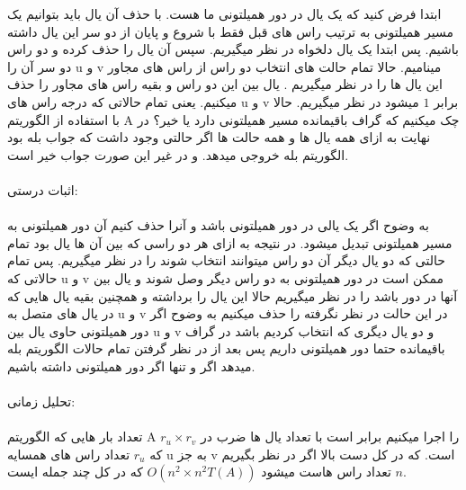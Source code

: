 \problem{}
ابتدا فرض کنید که یک یال در دور همیلتونی ما هست.
با حذف آن یال باید بتوانیم یک مسیر همیلتونی به ترتیب راس های قبل فقط با شروع و پایان از
دو سر این یال داشته باشیم.
پس ابتدا یک یال دلخواه در نظر میگیریم.
سپس آن یال را حذف کرده و دو راس دو سر آن را u و v مینامیم.
حالا تمام حالت های انتخاب دو راس از راس های مجاور این یال ها را در نظر میگیریم . 
یال بین این دو راس و بقیه راس های مجاور را حذف میکنیم.
یعنی تمام حالاتی که درجه راس های u و v برابر $1$ میشود در نظر میگیریم.
حالا با استفاده از الگوریتم A چک میکنیم که گراف باقیمانده مسیر همیلتونی دارد یا خیر؟
در نهایت به ازای همه یال ها و همه حالت ها اگر حالتی وجود داشت که جواب بله بود الگوریتم
بله خروجی میدهد. و در غیر این صورت جواب خیر است.
\\\\
اثبات درستی:\\
\\
به وضوح اگر یک یالی در دور همیلتونی باشد و آنرا حذف کنیم آن دور همیلتونی به مسیر همیلتونی 
تبدیل میشود.
در نتیجه به ازای هر دو راسی که بین آن ها یال بود
تمام حالتی که دو یال دیگر آن دو راس میتوانند انتخاب شوند را در نظر
میگیریم.
پس تمام حالاتی که u و v 
ممکن است در دور همیلتونی 
به دو راس دیگر وصل شوند و یال بین آنها
در دور باشد را در نظر میگیریم
حالا این یال را برداشته و همچنین بقیه یال هایی که در یال های متصل به 
u و v در این حالت در نظر نگرفته را حذف میکنیم
به وضوح اگر دور همیلتونی حاوی یال بین u و v و دو یال 
دیگری که انتخاب کردیم 
باشد در گراف باقیمانده حتما دور همیلتونی داریم
پس بعد از در نظر گرفتن تمام حالات 
الگوریتم بله میدهد اگر و تنها اگر 
دور همیلتونی داشته باشیم.
\\\\
تحلیل زمانی:\\\\
تعداد بار هایی که الگوریتم A را اجرا
میکنیم
برابر است با 
تعداد یال ها ضرب در $r_u \times r_v$
که $r_u$ تعداد راس های همسایه u به جز v است.
که در کل 
دست بالا اگر در نظر بگیریم $n$
تعداد راس هاست 
میشود
$O(n^2\times n^2 T(A))$
که در کل چند جمله ایست.

